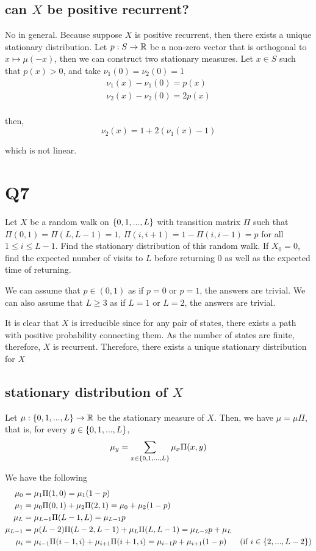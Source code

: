 \documentclass{article}
\begin{document}
\subsection{can $X$ be positive recurrent?}

No in general. Because suppose $X$ is positive recurrent, then there exists a unique stationary distribution. Let $p: S \to \mathbb{R}$ be a non-zero vector that is orthogonal to $x \mapsto \mu(-x)$, then we can construct two stationary measures. Let $x \in S$ such that $p(x) > 0$, and take $\nu_1(0) = \nu_2(0) = 1$
\begin{align*}
    \nu_1(x) - \nu_1(0) = p(x) \\
    \nu_2(x) - \nu_2(0) = 2p(x) \\
\end{align*}

then, 
$$
    \nu_2(x) = 1 + 2 (\nu_1(x) - 1)
$$

which is not linear.
\section{Q7}

Let $X$ be a random walk on $\{0, 1, ..., L\}$ with transition matrix $\Pi$ such that $\Pi(0, 1) = \Pi(L, L-1) = 1$, $\Pi(i, i+1) = 1 - \Pi(i, i-1) = p$ for all $1 \leq i \leq L-1$. Find the stationary distribution of this random walk. If $X_0 = 0$, find the expected number of visits to $L$ before returning $0$ as well as the expected time of returning.


We can assume that $p \in (0, 1)$ as if $p=0$ or $p=1$, the answers are trivial. We can also assume that $L \geq 3$ as if $L = 1$ or $L=2$, the answers are trivial.

It is clear that $X$ is irreducible since for any pair of states, there exists a path with positive probability connecting them. As the number of states are finite, therefore, $X$ is recurrent. Therefore, there exists a unique stationary distribution for $X$

\subsection{stationary distribution of $X$}

Let $\mu: \{0, 1, ..., L\} \to \mathbb{R}$ be the stationary measure of $X$. Then, we have $\mu = \mu \Pi$, that is, for every $y \in \{0, 1, ..., L\}$, 
$$
    \mu_y = \sum_{x \in \{0, 1, ..., L\}} \mu_x \Pi(x, y)
$$

We have the following
\begin{align*}
    \mu_0 &= \mu_1 \Pi(1, 0) = \mu_1 (1 - p) \\
    \mu_1 &= \mu_0 \Pi(0, 1) + \mu_2 \Pi(2, 1) = \mu_0 + \mu_2 (1-p) \\
    \mu_L &= \mu_{L-1} \Pi(L-1, L) = \mu_{L-1} p \\
    \mu_{L-1} &= \mu(L-2) \Pi(L-2, L-1) + \mu_L \Pi(L, L-1) = \mu_{L-2} p + \mu_L \\
    \mu_i &= \mu_{i-1} \Pi(i-1, i) + \mu_{i+1} \Pi(i+1, i) = \mu_{i-1} p + \mu_{i+1} (1-p) &\text{(if $i \in \{2, ..., L-2\}$)} 
\end{align*}
\end{document}
